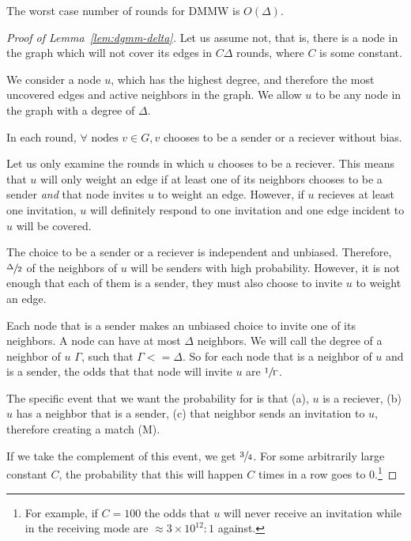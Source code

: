 \begin{lem}
  \label{lem:dgmm-delta}
  The worst case number of rounds for DMMW is $O(\Delta)$.
  \end{lem}
  

  \begin{proof}[Proof of Lemma~\ref{lem:dgmm-delta}]
  Let us assume not, that is, there is a node in the graph which will not cover its edges in $C\Delta$ rounds, where $C$ is some constant.

  We consider a node $u$, which has the highest degree, and therefore the most uncovered edges and active neighbors in the graph. We allow $u$ to be any node in the graph with a degree of $\Delta$.

  In each round, $\forall \text{ nodes } v \in G, v$ chooses to be a sender or a reciever without bias. 

  Let us only examine the rounds in which $u$ chooses to be a reciever. This means that $u$ will only weight an edge if at least one of its neighbors chooses to be a sender {\em and} that node invites $u$ to weight an edge. However, if $u$ recieves at least one invitation, $u$ will definitely respond to one invitation and one edge incident to $u$ will be covered.

  The choice to be a sender or a reciever is independent and unbiased. Therefore, $\sfrac{\Delta}{2}$ of the neighbors of $u$ will be senders with high probability. However, it is not enough that each of them is a sender, they must also choose to invite $u$ to weight an edge.

  Each node that is a sender makes an unbiased choice to invite one of its neighbors. A node can have at most $\Delta$ neighbors. We will call the degree of a neighbor of $u$ $\Gamma$, such that $\Gamma <= \Delta$. So for each node that is a neighbor of $u$ and is a sender, the odds that that node will invite $u$ are $\sfrac{1}{\Gamma}$.

  The specific event that we want the probability for is that (a), $u$ is a reciever, (b) $u$ has a neighbor that is a sender, (c) that neighbor sends an invitation to $u$, therefore creating a match (M).

  

  If we take the complement of this event, we get $\sfrac{3}{4}$. For some arbitrarily large constant $C$, the probability that this will happen $C$ times in a row goes to 0.\footnote{For example, if $C = 100$ the odds that $u$ will never receive an invitation while in the receiving mode are $\approx 3\times10^{12}:1$ against.} 


\end{proof}
